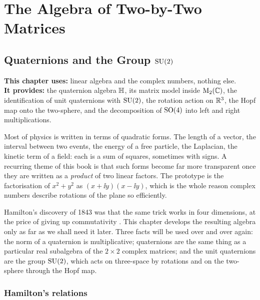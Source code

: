 \part{The Algebra of Two-by-Two Matrices}

\chapter{Quaternions and the Group \texorpdfstring{$\mathrm{SU}(2)$}{SU(2)}}
\label{ch:quaternions}

\begin{usesbox}
\textbf{This chapter uses:} linear algebra and the complex numbers, nothing else.\\
\textbf{It provides:} the quaternion algebra $\mathbb{H}$, its matrix model inside $\mathrm{M}_2(\mathbb{C})$, the identification of unit quaternions with $\mathrm{SU}(2)$, the rotation action on $\mathbb{R}^3$, the Hopf map onto the two-sphere, and the decomposition of $\mathrm{SO}(4)$ into left and right multiplications.
\end{usesbox}

Most of physics is written in terms of quadratic forms. The length of a vector, the interval between two events, the energy of a free particle, the Laplacian, the kinetic term of a field: each is a sum of squares, sometimes with signs. A recurring theme of this book is that such forms become far more transparent once they are written as a \emph{product} of two linear factors. The prototype is the factorisation of $x^2+y^2$ as $(x+\ii y)(x-\ii y)$, which is the whole reason complex numbers describe rotations of the plane so efficiently.

Hamilton's discovery of 1843 was that the same trick works in four dimensions, at the price of giving up commutativity \cite{Hamilton1844}. This chapter develops the resulting algebra only as far as we shall need it later. Three facts will be used over and over again: the norm of a quaternion is multiplicative; quaternions are the same thing as a particular real subalgebra of the $2\times 2$ complex matrices; and the unit quaternions are the group $\mathrm{SU}(2)$, which acts on three-space by rotations and on the two-sphere through the Hopf map.

\section{Hamilton's relations}

